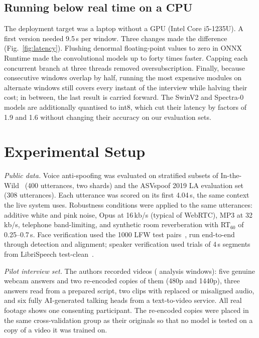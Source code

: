 \documentclass[conference]{IEEEtran}
\begin{document}
\subsection{Running below real time on a CPU}

The deployment target was a laptop without a GPU (Intel Core i5-1235U). A first version needed 9.5\,s per window.
Three changes made the difference (Fig.~\ref{fig:latency}). Flushing denormal floating-point values to zero in ONNX
Runtime made the convolutional models up to forty times faster. Capping each concurrent branch at three threads
removed oversubscription. Finally, because consecutive windows overlap by half, running the most expensive modules
on alternate windows still covers every instant of the interview while halving their cost; in between, the last
result is carried forward. The SwinV2 and Spectra-0 models are additionally quantised to int8, which cut their latency
by factors of 1.9 and 1.6 without changing their accuracy on our evaluation sets.

\section{Experimental Setup}

\textit{Public data.} Voice anti-spoofing was evaluated on stratified subsets of In-the-Wild~\cite{muller2022itw}
(400 utterances, two shards) and the ASVspoof 2019 LA evaluation set~\cite{wang2020asvspoof} (308 utterances). Each
utterance was scored on its first 4.04\,s, the same context the live system uses. Robustness conditions were applied to
the same utterances: additive white and pink noise, Opus at 16\,kb/s (typical of WebRTC), MP3 at 32\,kb/s, telephone
band-limiting, and synthetic room reverberation with RT$_{60}$ of 0.25--0.7\,s. Face verification used the 1000 LFW test
pairs~\cite{huang2007lfw}, run end-to-end through detection and alignment; speaker verification used \SpkTrials{} trials
of 4\,s segments from LibriSpeech test-clean~\cite{panayotov2015librispeech}.

\textit{Pilot interview set.} The authors recorded \NSess{} videos (\NWin{} analysis windows): five genuine webcam
answers and two re-encoded copies of them (480p and 1440p), three answers read from a prepared script, two clips with
replaced or misaligned audio, and six fully AI-generated talking heads from a text-to-video service. All real footage
shows one consenting participant. The re-encoded copies were placed in the same cross-validation group as their
originals so that no model is tested on a copy of a video it was trained on.
\end{document}
